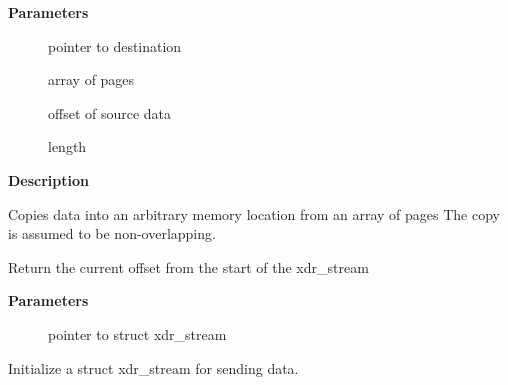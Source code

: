 \documentclass[a4paper,8pt,english]{sphinxmanual}
\begin{document}
\begin{fulllineitems}
\label{networking/kapi:c._copy_from_pages}
\end{fulllineitems}


\textbf{Parameters}
\begin{description}
\item[{}] \leavevmode
pointer to destination

\item[{}] \leavevmode
array of pages

\item[{}] \leavevmode
offset of source data

\item[{}] \leavevmode
length

\end{description}

\textbf{Description}

Copies data into an arbitrary memory location from an array of pages
The copy is assumed to be non-overlapping.

\begin{fulllineitems}
\label{networking/kapi:c.xdr_stream_pos}
Return the current offset from the start of the xdr\_stream

\end{fulllineitems}


\textbf{Parameters}
\begin{description}
\item[{}] \leavevmode
pointer to struct xdr\_stream

\end{description}

\begin{fulllineitems}
\label{networking/kapi:c.xdr_init_encode}
Initialize a struct xdr\_stream for sending data.

\end{fulllineitems}
\end{document}
